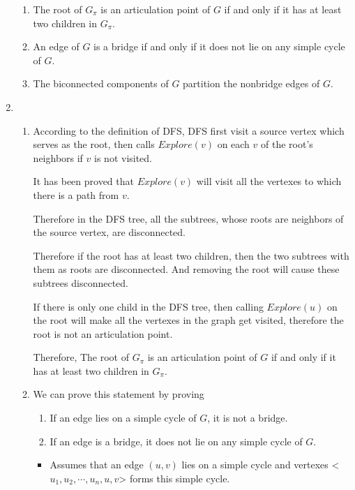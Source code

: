 \documentclass[12pt,a4paper]{article}
\makeatletter
\newtheorem*{solution}{Solution}
\theoremstyle{definition}
\renewenvironment{solution}[1][Solution] {\par\pushQED{\qed}\normalfont\topsep6\p@\@plus6\p@\relax\trivlist\item[\hskip\labelsep\bfseries#1\@addpunct{.}]\ignorespaces}{\popQED\endtrivlist\@endpefalse} \makeatother
\makeatother
\begin{document}
\begin{enumerate}
    \begin{enumerate}
    	\item The root of $G_{\pi}$ is an articulation point of $G$ if and only if it has at least two children in $G_{\pi}$.
    	\item An edge of $G$ is a bridge if and only if it does not lie on any simple cycle of $G$.
    	\item The biconnected components of $G$ partition the nonbridge edges of $G$.
    \end{enumerate}
    \begin{solution}
    	\begin{enumerate}
    		\item 
    		    According to the definition of DFS, DFS first visit a source vertex which serves as the root, then  calls $Explore(v)$ on each $v$ of the root's neighbors if $v$ is not visited.
    		    
    		    It has been proved that $Explore(v)$ will visit all the vertexes to which there is a path from $v$.
    		    
    		    Therefore in the DFS tree, all the subtrees, whose roots are neighbors of the source vertex, are disconnected.
    		    
    		    Therefore if the root has at least two children, then the two subtrees with them as roots are disconnected. And removing the root will cause these subtrees disconnected.
    		    
    		    If there is only one child in the DFS tree, then calling $Explore(u)$ on the root will make all the vertexes in the graph get visited, therefore the root is not an articulation point.
    		    
    		    Therefore, The root of $G_{\pi}$ is an articulation point of $G$ if and only if it has at least two children in $G_{\pi}$.
    		\item 
    		    We can prove this statement by proving 
    		    \begin{enumerate}
    		    	\item 
    		    	    If an edge lies on a simple cycle of $G$, it is not a bridge.
    		    	\item 
    		    	    If an edge is a bridge, it does not lie on any simple cycle of $G$.
    		    \end{enumerate}
    	        \begin{itemize}
    	        	\item 
    	        	    Assumes that an edge $(u,v)$ lies on a simple cycle and vertexes <$u_1, u_2, \cdots, u_n, u, v$> forms this simple cycle.
    	        	    

\end{itemize}
\end{enumerate}
\end{solution}
\end{enumerate}
\end{document}
